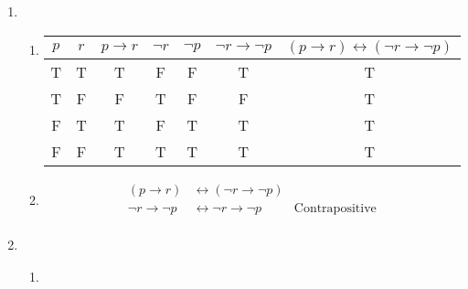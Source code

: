 \documentclass{article}
\begin{document}
\begin{enumerate}[label=\alph*.]
    \item \begin{enumerate}[label=\roman*.]
              \item \begin{center}
                        \begin{tabular}{|c|c|c|c|c|c|c|}
                            \hline
                            \( p \) & \( r \) & \( p \to r \) & \( \neg r \) & \( \neg p \) & \( \neg r \to \neg p \) & \( (p \to r) \leftrightarrow (\neg r \to \neg p) \) \\
                            \hline
                            T       & T       & T             & F            & F            & T                       & T                                                   \\
                            T       & F       & F             & T            & F            & F                       & T                                                   \\
                            F       & T       & T             & F            & T            & T                       & T                                                   \\
                            F       & F       & T             & T            & T            & T                       & T                                                   \\
                            \hline
                        \end{tabular}
                    \end{center}
              \item \[\begin{aligned}
                            (p \to r)         & \leftrightarrow (\neg r \to \neg p)                         \\
                            \neg r \to \neg p & \leftrightarrow \neg r \to \neg p   & \text{Contrapositive} \\
                        \end{aligned}\]
          \end{enumerate}
    \item \begin{enumerate}[label=\roman*.]
              \item \begin{center}
                        \begin{tabular}{|c|c|c|c|c|c|c|c|}

\end{tabular}
\end{center}
\end{enumerate}
\end{enumerate}
\end{document}
